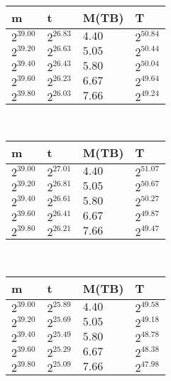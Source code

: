  \ 
\begin{tabular}{llll}
m & t & M(TB) & T \\ \hline
$2^{39.00}$ & $2^{26.83}$ & $4.40$ & $2^{50.84}$ \\
$2^{39.20}$ & $2^{26.63}$ & $5.05$ & $2^{50.44}$ \\
$2^{39.40}$ & $2^{26.43}$ & $5.80$ & $2^{50.04}$ \\
$2^{39.60}$ & $2^{26.23}$ & $6.67$ & $2^{49.64}$ \\
$2^{39.80}$ & $2^{26.03}$ & $7.66$ & $2^{49.24}$ \\
\end{tabular}
 \ 
\begin{tabular}{llll}
m & t & M(TB) & T \\ \hline
$2^{39.00}$ & $2^{27.01}$ & $4.40$ & $2^{51.07}$ \\
$2^{39.20}$ & $2^{26.81}$ & $5.05$ & $2^{50.67}$ \\
$2^{39.40}$ & $2^{26.61}$ & $5.80$ & $2^{50.27}$ \\
$2^{39.60}$ & $2^{26.41}$ & $6.67$ & $2^{49.87}$ \\
$2^{39.80}$ & $2^{26.21}$ & $7.66$ & $2^{49.47}$ \\
\end{tabular}
 \ 
\begin{tabular}{llll}
m & t & M(TB) & T \\ \hline
$2^{39.00}$ & $2^{25.89}$ & $4.40$ & $2^{49.58}$ \\
$2^{39.20}$ & $2^{25.69}$ & $5.05$ & $2^{49.18}$ \\
$2^{39.40}$ & $2^{25.49}$ & $5.80$ & $2^{48.78}$ \\
$2^{39.60}$ & $2^{25.29}$ & $6.67$ & $2^{48.38}$ \\
$2^{39.80}$ & $2^{25.09}$ & $7.66$ & $2^{47.98}$ \\
\end{tabular}